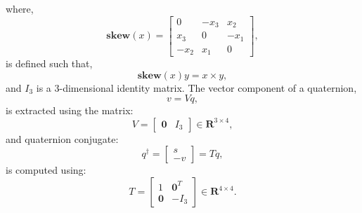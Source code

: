 where, 
\begin{equation}
	\mathbf{skew}(x) = \begin{bmatrix}  
		0 & -x_3 & x_2 \\
		x_3 & 0 & -x_1 \\
		-x_2 & x_1 & 0 
	\end{bmatrix},
\end{equation}
is defined such that,
\begin{equation}
	\mathbf{skew}(x) y = x \times y ,
\end{equation}
and $I_3$ is a 3-dimensional identity matrix. The vector component of a quaternion, 
\begin{equation} 
	v = V q,
\end{equation}
is extracted using the matrix:
\begin{equation}
	V = \begin{bmatrix}
		\mathbf{0} & I_3
	\end{bmatrix} \in \mathbf{R}^{3 \times 4},
\end{equation}
and quaternion conjugate: 
\begin{equation} 
	q^{\dagger} = \begin{bmatrix} s \\ -v \end{bmatrix} = T q,
\end{equation}
is computed using:
\begin{equation}
	T = \begin{bmatrix}
		1 & \mathbf{0}^T \\
		\mathbf{0} & -I_3
	\end{bmatrix} \in \mathbf{R}^{4 \times 4}.
\end{equation}
	

